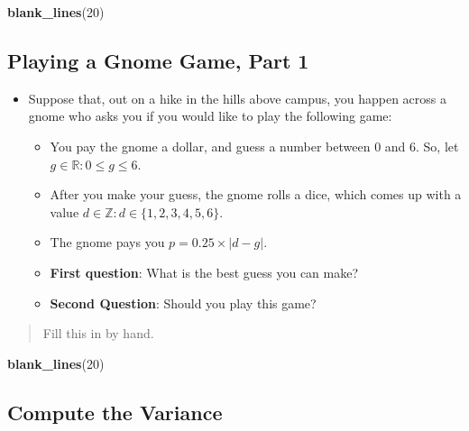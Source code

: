 \documentclass[
]{book}
\newenvironment{Shaded}{\begin{snugshade}}{\end{snugshade}}
\newcommand{\DecValTok}[1]{\textcolor[rgb]{0.00,0.00,0.81}{#1}}
\newcommand{\FunctionTok}[1]{\textcolor[rgb]{0.13,0.29,0.53}{\textbf{#1}}}
\newcommand{\NormalTok}[1]{#1}
\providecommand{\tightlist}{%
  \setlength{\itemsep}{0pt}\setlength{\parskip}{0pt}}
\theoremstyle{definition}
\theoremstyle{definition}
\theoremstyle{definition}
\theoremstyle{definition}
\theoremstyle{remark}
\begin{document}
\begin{Shaded}
\begin{Highlighting}[]
\FunctionTok{blank\_lines}\NormalTok{(}\DecValTok{20}\NormalTok{)}
\end{Highlighting}
\end{Shaded}

\vspace{20cm}

\hypertarget{playing-a-gnome-game-part-1}{%
\subsection{Playing a Gnome Game, Part 1}\label{playing-a-gnome-game-part-1}}

\begin{itemize}
\tightlist
\item
  Suppose that, out on a hike in the hills above campus, you happen across a gnome who asks you if you would like to play the following game:

  \begin{itemize}
  \tightlist
  \item
    You pay the gnome a dollar, and guess a number between 0 and 6. So, let \(g \in \mathbb{R}: 0 \leq g \leq 6\).
  \item
    After you make your guess, the gnome rolls a dice, which comes up with a value \(d \in \mathbb{Z}: d \in \{1,2,3,4,5,6\}\).
  \item
    The gnome pays you \(p = 0.25 \times |d - g|\).
  \item
    \textbf{First question}: What is the best guess you can make?
  \item
    \textbf{Second Question}: Should you play this game?
  \end{itemize}
\end{itemize}

\begin{quote}
Fill this in by hand.
\end{quote}

\begin{Shaded}
\begin{Highlighting}[]
\FunctionTok{blank\_lines}\NormalTok{(}\DecValTok{20}\NormalTok{)}
\end{Highlighting}
\end{Shaded}

\vspace{20cm}

\hypertarget{compute-the-variance}{%
\subsection{Compute the Variance}\label{compute-the-variance}}
\end{document}

